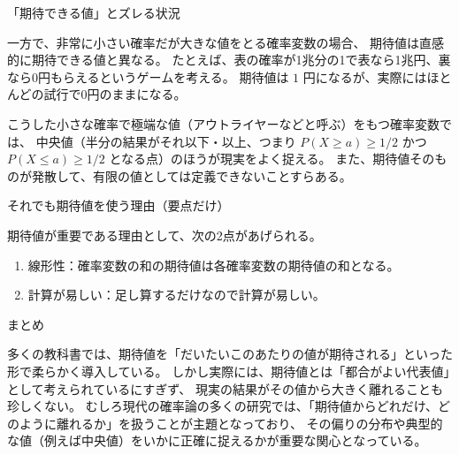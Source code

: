 \documentclass[a4paper,10pt,pdflatex,ja=standard,jafont=ipaex-type1,
  magstyle=real,scale=1]{bxjsarticle}
\newcommand{\columnheading}[1]{\par\vspace{5pt}
  {\fontsize{11pt}{15pt}\selectfont\sffamily\mdseries\color{accent}#1}\par\vspace{2pt}}
\begin{document}
\columnheading{「期待できる値」とズレる状況}
一方で、非常に小さい確率だが大きな値をとる確率変数の場合、
期待値は直感的に期待できる値と異なる。
たとえば、表の確率が1兆分の1で表なら1兆円、裏なら0円もらえるというゲームを考える。
期待値は $1$ 円になるが、実際にはほとんどの試行で0円のままになる。

こうした小さな確率で極端な値（アウトライヤーなどと呼ぶ）をもつ確率変数では、
中央値（半分の結果がそれ以下・以上、つまり
$P(X\ge a)\ge1/2$ かつ $P(X\le a)\ge1/2$ となる点）のほうが現実をよく捉える。
また、期待値そのものが発散して、有限の値としては定義できないことすらある。

\columnheading{それでも期待値を使う理由（要点だけ）}
期待値が重要である理由として、次の2点があげられる。
\begin{enumerate}[label=\arabic*.,itemsep=2pt,topsep=3pt]
\item 線形性：確率変数の和の期待値は各確率変数の期待値の和となる。
\item 計算が易しい：足し算するだけなので計算が易しい。
\end{enumerate}

\columnheading{まとめ}
多くの教科書では、期待値を「だいたいこのあたりの値が期待される」といった形で柔らかく導入している。
しかし実際には、期待値とは「都合がよい代表値」として考えられているにすぎず、
現実の結果がその値から大きく離れることも珍しくない。
むしろ現代の確率論の多くの研究では、「期待値からどれだけ、どのように離れるか」を扱うことが主題となっており、
その偏りの分布や典型的な値（例えば中央値）をいかに正確に捉えるかが重要な関心となっている。

\label{lastpage}
\end{document}
